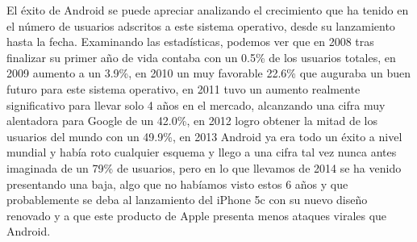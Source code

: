 El éxito de Android se puede apreciar analizando el crecimiento que ha tenido en el número de usuarios adscritos a este sistema operativo, desde su lanzamiento hasta la fecha. 
Examinando las estadísticas, podemos ver que en 2008 tras finalizar su primer año de vida contaba con un 0.5\% de los usuarios totales, en 2009 aumento a un 3.9\%, en 2010 un muy 
favorable 22.6\% que auguraba un buen futuro para este sistema operativo, en 2011 tuvo un aumento realmente significativo para llevar solo 4 años en el mercado, alcanzando una 
cifra muy alentadora para Google de un 42.0\%, en 2012 logro obtener la mitad de los usuarios del mundo con un 49.9\%, en 2013 Android ya era todo un éxito a nivel mundial y 
había roto cualquier esquema y llego a una cifra tal vez nunca antes imaginada de un 79\% de usuarios, pero en lo que llevamos de 2014 se ha venido presentando una baja, algo que 
no habíamos visto estos 6 años y que probablemente se deba al lanzamiento del iPhone 5c con su nuevo diseño renovado y a que este producto de Apple presenta menos ataques virales 
que Android.